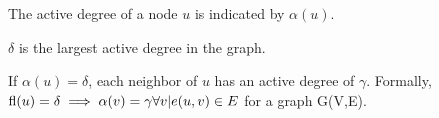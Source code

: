 \begin{ldef}
The active degree of a node $u$ is indicated by $\alpha(u)$.
\end{ldef}
\begin{ldef}
$\delta$ is the largest active degree in the graph.
\end{ldef}
\begin{ldef}
If $\alpha(u) = \delta$, each neighbor of $u$ has an active degree of $\gamma$. Formally, $\active(u) = \delta \implies \alpha (v) = \gamma \forall v | e(u,v) \in E$ for a graph G(V,E).
\end{ldef}
